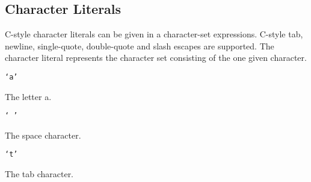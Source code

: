 
\subsection{Character Literals}
{
	C-style character literals can be given in a character-set expressions.
	C-style tab, newline, single-quote, double-quote and slash escapes are
	supported.
	The character literal represents the character set consisting of
	the one given character.
	
	\begin{itemize}
	{
		\item \texttt{`a'}
		
			The letter a.
		
		\item \texttt{` '}
		
			The space character.
		
		\item \texttt{`t'}
		
			The tab character.
	}
	\end{itemize}
}
